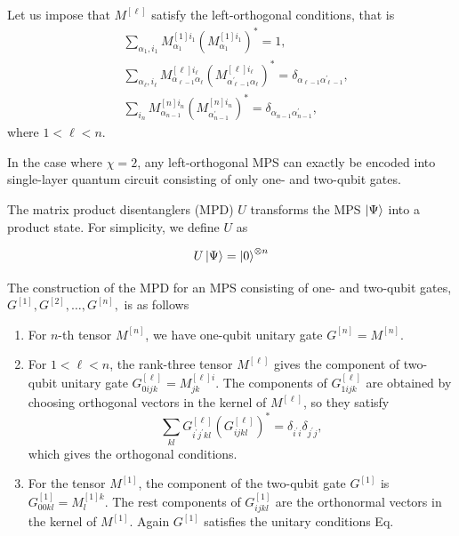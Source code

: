 \documentclass[11pt, oneside]{article}   	%
\begin{document}
Let us impose that $M^{[\ell]}$ satisfy the left-orthogonal conditions, that is
\begin{align}
&\sum_{\alpha_1, i_1} M^{[1] i_1}_{\alpha_1} \left( M^{[1] i_1}_{\alpha_1} \right)^{\ast} = 1, \\
&\sum_{\alpha_{\ell}, i_{\ell}} M^{[\ell] i_{\ell}}_{\alpha_{\ell - 1} \alpha_{\ell}} \left( M^{[\ell] i_{\ell}}_{\alpha^{\prime}_{\ell - 1} \alpha_{\ell}} \right)^{\ast} = \delta_{\alpha_{\ell - 1} \alpha^{\prime}_{\ell - 1}}, \\
&\sum_{i_n} M^{[n] i_n}_{\alpha_{n-1}} \left( M^{[n] i_n}_{\alpha^{\prime}_{n-1}} \right)^{\ast} = \delta_{\alpha_{n - 1} \alpha^{\prime}_{n - 1}},
\end{align}
where $1 < \ell < n$.

In the case where $\chi = 2$, any left-orthogonal MPS can exactly be encoded into single-layer quantum circuit consisting of only one- and two-qubit gates.

The matrix product disentanglers (MPD) $U$ transforms the MPS $\ket{\Psi}$ into a product state. 
For simplicity, we define $U$ as

\begin{equation}
U \ket{\Psi} = \ket{0}^{\otimes n}
\end{equation}

The construction of the MPD for an MPS consisting of one- and two-qubit gates, $G^{[1]}, G^{[2]}, \dots, G^{[n]}, $ is as follows

\begin{enumerate}
\item
For $n$-th tensor $M^{[n]}$, we have one-qubit unitary gate $G^{[n]} = M^{[n]}$.
\item
For $1 < \ell < n$, the rank-three tensor $M^{[\ell]}$ gives the component of two-qubit unitary gate $G^{[\ell]}_{0ijk} = M^{[\ell] i}_{jk}$.
The components of $G^{[\ell]}_{1ijk}$ are obtained by choosing orthogonal vectors in the kernel of $M^{[\ell]}$, so they satisfy
\begin{equation}
\sum_{kl} G^{[\ell]}_{i^{\prime} j^{\prime} kl} \left( G^{[\ell]}_{ijkl} \right)^{\ast} = \delta_{i^{\prime} i} \delta_{j^{\prime} j},
\end{equation}
which gives the orthogonal conditions.
\item
For the tensor $M^{[1]}$, the component of the two-qubit gate $G^{[1]}$ is $G^{[1]}_{00kl} = M^{[1] k}_l$.
The rest components of $G^{[1]}_{ijkl}$ are the orthonormal vectors in the kernel of $M^{[1]}$.
Again $G^{[1]}$ satisfies the unitary conditions Eq.
\end{enumerate}
\end{document}
